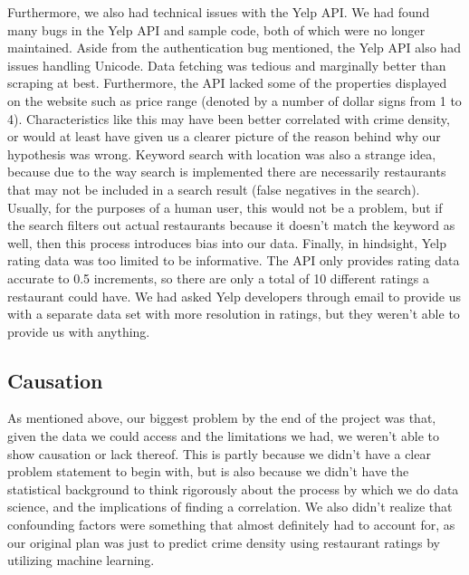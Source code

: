 \documentclass{article}
\begin{document}
Furthermore, we also had technical issues with the Yelp API. We had found
many bugs in the Yelp API and sample code, both of which were no longer
maintained. Aside from the authentication bug mentioned, the Yelp API also
had issues handling Unicode. Data fetching was tedious and marginally
better than scraping at best. Furthermore, the API lacked some of the
properties displayed on the website such as price range (denoted by a
number of dollar signs from 1 to 4). Characteristics like this may have
been better correlated with crime density, or would at least have given us
a clearer picture of the reason behind why our hypothesis was
wrong. Keyword search with location was also a strange idea, because due to
the way search is implemented there are necessarily restaurants that may
not be included in a search result (false negatives in the
search). Usually, for the purposes of a human user, this would not be a
problem, but if the search filters out actual restaurants because it
doesn't match the keyword as well, then this process introduces bias into
our data. Finally, in hindsight, Yelp rating data was too limited to be
informative. The API only provides rating data accurate to 0.5 increments,
so there are only a total of 10 different ratings a restaurant could
have. We had asked Yelp developers through email to provide us with a
separate data set with more resolution in ratings, but they weren't able to
provide us with anything.

\subsection{Causation}

As mentioned above, our biggest problem by the end of the project was that,
given the data we could access and the limitations we had, we weren't able
to show causation or lack thereof. This is partly because we didn't have a
clear problem statement to begin with, but is also because we didn't have
the statistical background to think rigorously about the process by which
we do data science, and the implications of finding a correlation. We also
didn't realize that confounding factors were something that almost
definitely had to account for, as our original plan was just to predict
crime density using restaurant ratings by utilizing machine learning.

\end{document}
